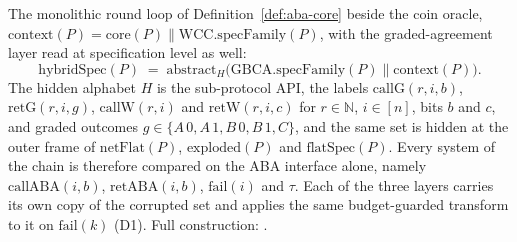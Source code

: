 \begin{definition}
  \label{def:aba-hybrids}
  \leanok
  The monolithic round loop of Definition~\ref{def:aba-core} beside the coin oracle, $\mathrm{context}(P) = \mathrm{core}(P) \parallel \mathrm{WCC.specFamily}(P)$, with the graded-agreement layer read at specification level as well:
  \[
    \mathrm{hybridSpec}(P) \;=\; \mathrm{abstract}_H\bigl(
      \mathrm{GBCA.specFamily}(P) \parallel \mathrm{context}(P) \bigr).
  \]
  The hidden alphabet $H$ is the sub-protocol API, the labels $\mathrm{callG}(r,i,b)$, $\mathrm{retG}(r,i,g)$, $\mathrm{callW}(r,i)$ and $\mathrm{retW}(r,i,c)$ for $r \in \mathbb{N}$, $i \in [n]$, bits $b$ and $c$, and graded outcomes $g \in \{A\,0, A\,1, B\,0, B\,1, C\}$, and the same set is hidden at the outer frame of $\mathrm{netFlat}(P)$, $\mathrm{exploded}(P)$ and $\mathrm{flatSpec}(P)$.
  Every system of the chain is therefore compared on the ABA interface alone, namely $\mathrm{callABA}(i,b)$, $\mathrm{retABA}(i,b)$, $\mathrm{fail}(i)$ and $\tau$.
  Each of the three layers carries its own copy of the corrupted set and applies the same budget-guarded transform to it on $\mathrm{fail}(k)$ (D1).
  Full construction: .
\end{definition}

